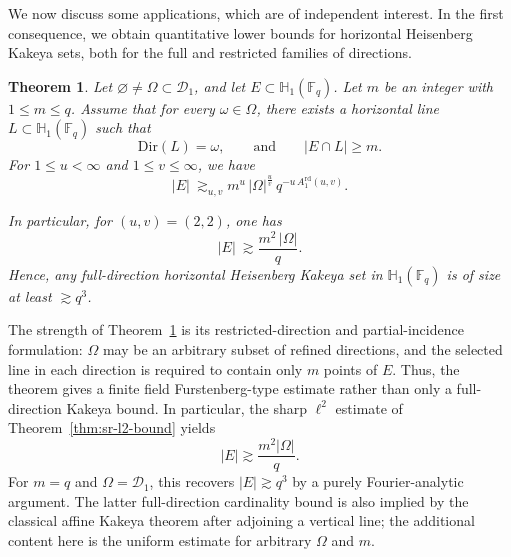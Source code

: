 \documentclass[11pt]{article}
\newtheorem{theorem}{Theorem}[section]
\newcommand{\1}{\mathbf 1}
\begin{document}
We now discuss some applications, which are of independent interest. In the first consequence, we obtain quantitative lower
bounds for horizontal Heisenberg Kakeya sets, both for the full and restricted families of directions.

\begin{theorem}
\label{thm:Nm-refined}
{ Let $\varnothing \neq \Omega\subset \mathcal D_1$,} and let $E\subset \mathbb H_1(\mathbb F_q)$.
Let $m$ be an integer with $1\le m\le q$.
Assume that for every $\omega\in\Omega$, there exists a horizontal line
$L\subset \mathbb H_1(\mathbb F_q)$ such that
\[
\mathrm{Dir}(L)=\omega,
\qquad\text{and}\qquad
|E\cap L|\ge m.
\]
For $1\le u< \infty$ and $1\le v\le \infty$, we have
\begin{equation}\label{eq:Nm-uv-lower}
|E|
\ \gtrsim_{u, v} m^{u}\,|\Omega|^{\frac{u}{v}}\, q^{-u\,A^{\mathrm{rd}}_1(u,v)}.
\end{equation}



In particular, for $(u,v)=(2,2)$, one has 
\begin{equation}\label{eq:Nm-22}
|E|\ \gtrsim  \frac{m^2\,|\Omega|}{q}.
\end{equation}
Hence, any full-direction horizontal Heisenberg Kakeya set in $\mathbb{H}_1(\mathbb{F}_q)$ is of size at least $\gtrsim q^3$.
\end{theorem}

{  The strength of Theorem~\ref{thm:Nm-refined} is its
restricted-direction and partial-incidence formulation:
$\Omega$ may be an arbitrary subset of refined directions,
and the selected line in each direction is required to contain
only $m$ points of $E$. Thus, the theorem gives a
finite field Furstenberg-type estimate rather than only a
full-direction Kakeya bound. In particular, the sharp
$\ell^2$ estimate of Theorem~\ref{thm:sr-l2-bound} yields
\[
|E|\gtrsim \frac{m^2|\Omega|}{q}.
\]
For $m=q$ and $\Omega=\mathcal D_1$, this recovers
$|E|\gtrsim q^3$ by a purely Fourier-analytic argument.
The latter full-direction cardinality bound is also implied
by the classical affine Kakeya theorem after adjoining a
vertical line; the additional content here is the uniform
estimate for arbitrary $\Omega$ and $m$.}
\end{document}
